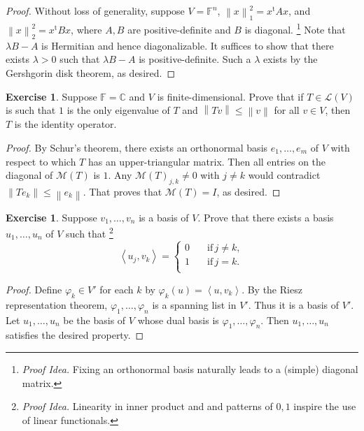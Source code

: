 \documentclass[nofonts,colorlinks]{tufte-handout}
\theoremstyle{plain} %
\theoremstyle{definition}
\newtheorem{exer}[thm]{Exercise}
\theoremstyle{remark}
\def\idea{\textit{\color[rgb]{0,0,.55}Proof Idea. }}
\newcommand{\bra}[1]{\mathopen{}\left(#1\right)}
\newcommand{\norm}[1]{\mathopen{}\left\lVert#1\right\rVert}
\newcommand{\inp}[2]{\mathopen{}\left\langle#1,#2\right\rangle}
\newcommand{\abs}[1]{\mathopen{}\left|#1\right|}
\renewcommand{\phi}{\varphi}
\newcommand{\C}{\mathbb{C}}
\newcommand{\F}{\mathbb{F}}
\renewcommand{\L}{\mathcal{L}}
\newcommand{\M}{\mathcal{M}}
\renewcommand{\intercal}{\mathrm{t}}
\begin{document}
\begin{proof}
	Without loss of generality, suppose $V=\F^n$, $\norm{x}_1^2=x^\intercal Ax$, and $\norm{x}_2^2=x^\intercal Bx$, where $A,B$ are positive-definite and $B$ is diagonal.%
	\footnote{\idea Fixing an orthonormal basis naturally leads to a (simple) diagonal matrix.}
	Note that $\lambda B-A$ is Hermitian and hence diagonalizable. It suffices to show that there exists $\lambda>0$ such that $\lambda B-A$ is positive-definite. Such a $\lambda$ exists by the Gershgorin disk theorem, as desired.
\end{proof}

\begin{exer}
	Suppose $\F=\C$ and $V$ is finite-dimensional. Prove that if $T\in\L(V)$ is such that $1$ is the only eigenvalue of $T$ and $\norm{Tv}\leq\norm{v}$ for all $v\in V$, then $T$ is the identity operator.
\end{exer}
\begin{proof}
	By Schur's theorem, there exists an orthonormal basis $e_1,\dots,e_m$ of $V$ with respect to which $T$ has an upper-triangular matrix. Then all entries on the diagonal of $\M(T)$ is $1$. Any $\M(T)_{j,k}\neq0$ with $j\neq k$ would contradict $\norm{Te_k}\leq\norm{e_k}$. That proves that $\M(T)=I$, as desired.
\end{proof}

\begin{exer}
	Suppose $v_1,\dots,v_n$ is a basis of $V$. Prove that there exists a basis $u_1,\dots,u_n$ of $V$ such that%
	\footnote{\idea Linearity in inner product and and patterns of $0,1$ inspire the use of linear functionals.}
	\[\inp{u_j}{v_k}=\left\{\begin{aligned}
		0 \quad & \text{if}\, j\neq k,\\
		1 \quad & \text{if}\, j=k.\\
	\end{aligned}\right.\]
\end{exer}
\begin{proof}
	Define $\phi_k\in V'$ for each $k$ by $\phi_k(u)=\inp{u}{v_k}$. By the Riesz representation theorem, $\phi_1,\dots,\phi_n$ is a spanning list in $V'$. Thus it is a basis of $V'$. Let $u_1,\dots,u_n$ be the basis of $V$ whose dual basis is $\phi_1,\dots,\phi_n$. Then $u_1,\dots,u_n$ satisfies the desired property.
\end{proof}
\end{document}
